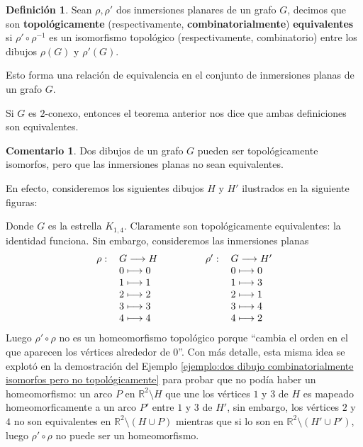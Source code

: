 \documentclass[12pt]{report}
\theoremstyle{plain}
\theoremstyle{definition}
\newtheorem{definition}[theorem]{Definición}
\newtheorem{remark}[theorem]{Comentario}
\newcommand{\reals}{\mathbb{R}}
\begin{document}
\begin{definition}
Sean $\rho, \rho '$ dos inmersiones planares de un grafo $G$, decimos que son \textbf{topológicamente} (respectivamente, \textbf{combinatorialmente}) \textbf{equivalentes} si $\rho ' \circ \rho^{-1}$ es un isomorfismo topológico (respectivamente, combinatorio) entre los dibujos $\rho (G)$ y $\rho ' (G)$.

Esto forma una relación de equivalencia en el conjunto de inmersiones planas de un grafo $G$.
\end{definition}
Si $G$ es $2$-conexo, entonces el teorema anterior nos dice que ambas definiciones son equivalentes.

\begin{remark}
Dos dibujos de un grafo $G$ pueden ser topológicamente isomorfos, pero que las inmersiones planas no sean equivalentes.

En efecto, consideremos los siguientes dibujos $H$ y $H'$ ilustrados en la siguiente figuras:


Donde $G$ es la estrella $K_{1,4}$. Claramente son topológicamente equivalentes: la identidad funciona. Sin embargo, consideremos las inmersiones planas
\[
\begin{tabular}{lllllllll}
$\rho :$ & $G\longrightarrow H$ & & & & $\rho ' :$ & $G\longrightarrow H'$ \\
&$0\longmapsto 0$ & & & & &$0\longmapsto 0$ \\
&$1\longmapsto 1$ & & & & &$1\longmapsto 3$ \\
&$2\longmapsto 2$ & & & & &$2\longmapsto 1$ \\
&$3\longmapsto 3$ & & & & &$3\longmapsto 4$ \\
&$4\longmapsto 4$ & & & & &$4\longmapsto 2$
\end{tabular}
\]
Luego $\rho ' \circ \rho$ no es un homeomorfismo topológico porque ``cambia el orden en el que aparecen los vértices alrededor de $0$''. Con más detalle, esta misma idea se explotó en la demostración del Ejemplo \ref{ejemplo:dos dibujo combinatorialmente isomorfos pero no topológicamente} para probar que no podía haber un homeomorfismo: un arco $P$ en $\reals^2 \setminus H$ que une los vértices $1$ y $3$ de $H$ es mapeado homeomorficamente a un arco $P'$ entre $1$ y $3$ de $H'$, sin embargo, los vértices $2$ y $4$ no son equivalentes en $\reals^2 \setminus (H \cup P)$ mientras que si lo son en $\reals^2 \setminus (H' \cup P')$, luego $\rho ' \circ \rho$ no puede ser un homeomorfismo.
\end{remark}
\end{document}

